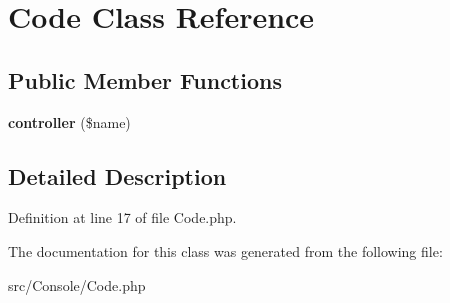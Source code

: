 \hypertarget{class_zest_1_1_console_1_1_code}{}\section{Code Class Reference}
\label{class_zest_1_1_console_1_1_code}
\subsection*{Public Member Functions}
\begin{DoxyCompactItemize}
\item 
\mbox{\label{class_zest_1_1_console_1_1_code_a0576addfbb4c1ae22ad655b59ce224ee}} 
{\bfseries controller} (\$name)
\end{DoxyCompactItemize}


\subsection{Detailed Description}


Definition at line 17 of file Code.\+php.



The documentation for this class was generated from the following file\+:\begin{DoxyCompactItemize}
\item 
src/\+Console/Code.\+php\end{DoxyCompactItemize}

